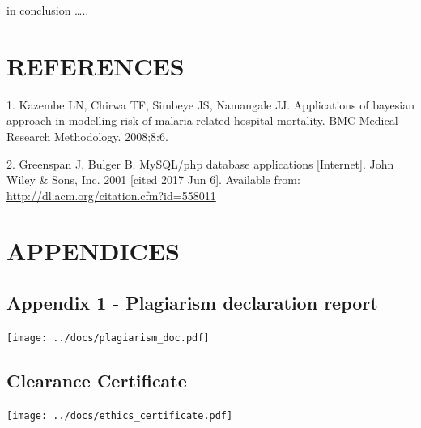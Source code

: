 \documentclass[12pt,]{article}
\begin{document}
in conclusion \ldots{}..

\addtocounter{section}{5}

\newpage

\section{REFERENCES}\label{references}

\small 

\hypertarget{refs}{}
\hypertarget{ref-Black2013}{}
1. Kazembe LN, Chirwa TF, Simbeye JS, Namangale JJ. Applications of
bayesian approach in modelling risk of malaria-related hospital
mortality. BMC Medical Research Methodology. 2008;8:6.

\hypertarget{ref-Black2008}{}
2. Greenspan J, Bulger B. MySQL/php database applications
{[}Internet{]}. John Wiley \& Sons, Inc. 2001 {[}cited 2017 Jun 6{]}.
Available from: \url{http://dl.acm.org/citation.cfm?id=558011}

\section{APPENDICES}\label{appendices}

\subsection{Appendix 1 - Plagiarism declaration
report}\label{appendix-1---plagiarism-declaration-report}

\texttt{[image: ../docs/plagiarism\_doc.pdf]}

\addtocounter{section}{4}

\subsection{Clearance Certificate}\label{clearance-certificate}

\texttt{[image: ../docs/ethics\_certificate.pdf]}
\end{document}
